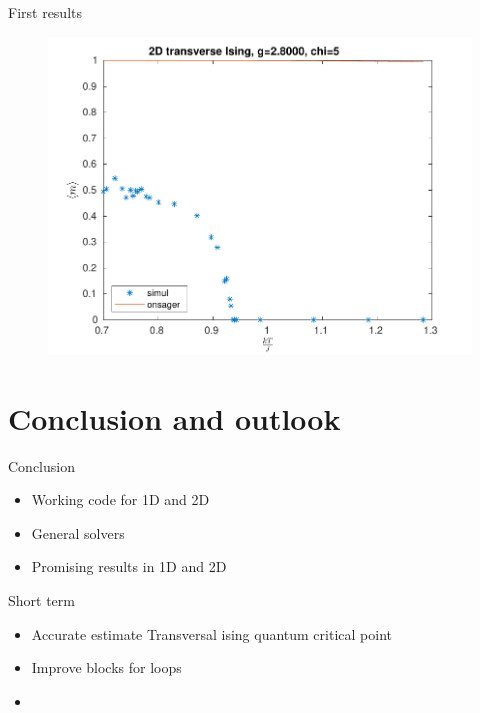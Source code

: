\documentclass[aspectratio=169]{beamer}
\begin{document}
\begin{frame}{First results}
    \begin{figure}
        \includegraphics[scale=0.4]{Figures/g28.pdf}
    \end{figure}
\end{frame}


\section{Conclusion and outlook}
\begin{frame}{Conclusion}
    \begin{itemize}
        \item Working code for 1D and 2D
        \item General solvers
        \item Promising results in 1D and 2D
    \end{itemize}
\end{frame}


\begin{frame}{Short term}
    \begin{itemize}
        \item Accurate estimate Transversal ising quantum critical point
        \item Improve blocks for loops
        \item
    \end{itemize}
\end{frame}
\end{document}
